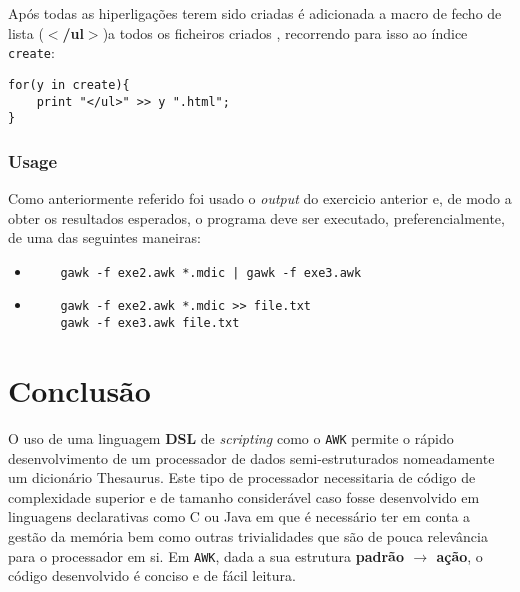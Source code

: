 \documentclass{llncs}
\begin{document}
Após todas as hiperligações terem sido criadas é adicionada a macro de fecho de lista (\textbf{$<$/ul$>$})a todos os ficheiros criados , recorrendo para isso ao índice \texttt{create}:
\begin{verbatim}
for(y in create){
    print "</ul>" >> y ".html";
}
\end{verbatim}

\subsubsection{Usage}
Como anteriormente referido foi usado o \textit{output} do exercicio anterior e, de modo a obter os resultados esperados, o programa deve ser executado, preferencialmente, de uma das seguintes maneiras:
\begin{itemize}
    \item \begin{verbatim}
    gawk -f exe2.awk *.mdic | gawk -f exe3.awk
    \end{verbatim}
    \item \begin{verbatim}
    gawk -f exe2.awk *.mdic >> file.txt
    gawk -f exe3.awk file.txt
    \end{verbatim}
\end{itemize}

\section{Conclusão}
O uso de uma linguagem \textbf{DSL} de \textit{scripting} como o \texttt{AWK} permite o rápido desenvolvimento de um processador de dados semi-estruturados nomeadamente um dicionário Thesaurus. Este tipo de processador necessitaria de código de complexidade superior e de tamanho considerável caso fosse desenvolvido em linguagens declarativas como C ou Java em que é necessário ter em conta a gestão da memória bem como outras trivialidades que são de pouca relevância para o processador em si. Em \texttt{AWK}, dada a sua estrutura \textbf{padrão $\to$ ação}, o código desenvolvido é conciso e de fácil leitura.
\end{document}
